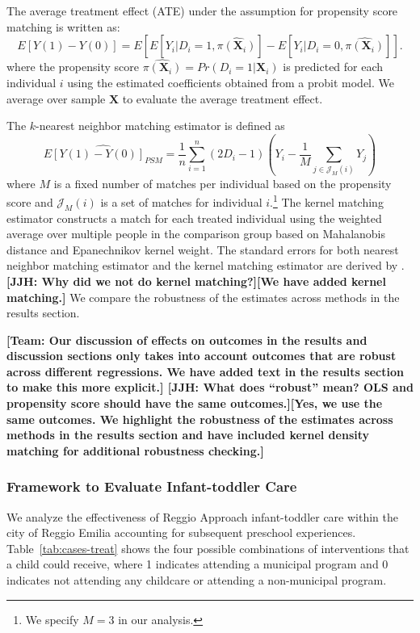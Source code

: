 The average treatment effect (ATE) under the assumption for propensity score matching is written as:
\begin{equation} \label{eq:ATE-PSM}
E[Y(1)-Y(0)] = E[E[Y_i|D_i=1, \hat{\pi(\boldsymbol{X}_i)}] - E[Y_i|D_i=0, \hat{\pi(\boldsymbol{X}_i)}]].
\end{equation}
where the propensity score $\hat{\pi({\boldsymbol{X}_i})} = Pr(D_i=1|\boldsymbol{X}_i)$ is predicted for each individual $i$ using the estimated coefficients obtained from a probit model. We average over sample $\bm{X}$ to evaluate the average treatment effect.

The $k$-nearest neighbor matching estimator is defined as
\begin{equation} \label{eq:PSM-estimator}
\widehat{E[Y(1)-Y(0)]_{PSM}} = \frac{1}{n} \sum_{i=1}^{n} (2D_i -1)(Y_i - \frac{1}{M}\sum_{j \in \mathcal{J}_M(i)}Y_j )
\end{equation}
where $M$ is a fixed number of matches per individual based on the propensity score and $\mathcal{J}_M(i)$ is a set of matches for individual $i$.\footnote{We specify $M = 3$ in our analysis.} The kernel matching estimator constructs a match for each treated individual using the weighted average over multiple people in the comparison group based on Mahalanobis distance and Epanechnikov kernel weight. The standard errors for both nearest neighbor matching estimator and the kernel matching estimator are derived by \cite{Abadie_Imbens_2006_Econometrica}. \textbf{[JJH: Why did we not do kernel matching?][We have added kernel matching.]} We compare the robustness of the estimates across methods in the results section.

\textbf{[Team: Our discussion of effects on outcomes in the results and discussion sections only takes into account outcomes that are robust across different regressions.  We have added text in the results section to make this more explicit.] [JJH: What does ``robust'' mean? OLS and propensity score should have the same outcomes.][Yes, we use the same outcomes. We highlight the robustness of the estimates across methods in the results section and have included kernel density matching for additional robustness checking.]}

\subsubsection{Framework to Evaluate Infant-toddler Care}
\label{subsubsection:itc}

We analyze the effectiveness of Reggio Approach infant-toddler care within the city of Reggio Emilia accounting for subsequent preschool experiences. Table~\ref{tab:cases-treat} shows the four possible combinations of interventions that a child could receive, where 1 indicates attending a municipal program and 0 indicates not attending any childcare or attending a non-municipal program.

